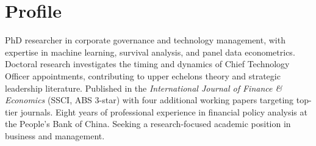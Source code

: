 \section{Profile}
PhD researcher in corporate governance and technology management, with expertise in machine learning, survival analysis, and panel data econometrics. Doctoral research investigates the timing and dynamics of Chief Technology Officer appointments, contributing to upper echelons theory and strategic leadership literature. Published in the \textit{International Journal of Finance \& Economics} (SSCI, ABS 3-star) with four additional working papers targeting top-tier journals. Eight years of professional experience in financial policy analysis at the People's Bank of China. Seeking a research-focused academic position in business and management.
